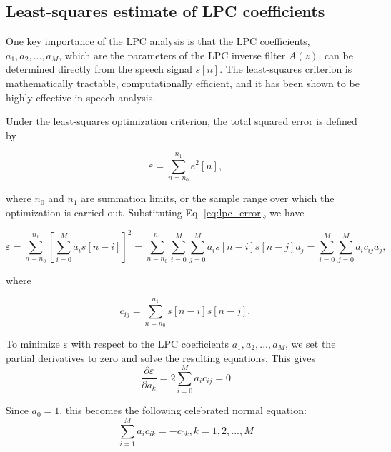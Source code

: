 \documentclass[12pt, a4paper, twoside]{report}
\begin{document}
\subsection{Least-squares estimate of LPC coefficients}
One key importance of the LPC analysis is that the LPC coefficients, $a_1, a_2, ..., a_M$, which are the parameters of the LPC inverse filter $A(z)$, can be determined directly from the speech signal $s[n]$. The least-squares criterion is mathematically tractable, computationally efficient, and it has been shown to be highly effective in speech analysis.

Under the least-squares optimization criterion, the total squared error is defined by

\begin{equation}
\varepsilon = \sum_{n=n_0}^{n_1} e^2[n],
\end{equation}

where $n_0$ and $n_1$ are summation limits, or the sample range over which the optimization is carried out. Substituting Eq. \ref{eq:lpc_error}, we have

\begin{equation}
\varepsilon = \sum_{n=n_0}^{n_1} \left [ \sum_{i=0}^{M} a_i s[n-i] \right ]^2 = \sum_{n=n_0}^{n_1} \sum_{i=0}^{M} \sum_{j=0}^{M} a_i s[n-i] s[n-j] a_j = \sum_{i=0}^{M} \sum_{j=0}^{M} a_i c_{ij} a_j,
\end{equation}

where

\begin{equation}
c_{ij} = \sum_{n=n_0}^{n_1} s[n-i] s[n-j],
\end{equation}

To minimize $\varepsilon$ with respect to the LPC coefficients $a_1, a_2, ..., a_M$, we set the partial derivatives to zero and solve the resulting equations. This gives
\begin{equation}
\frac{\partial \varepsilon }{\partial a_k} = 2 \sum_{i=0}^{M} a_i c_{ij} = 0
\end{equation}

Since $a_0 = 1$, this becomes the following celebrated normal equation:
\begin{equation}
\sum_{i=1}^{M} a_i c_{ik} = -c_{0k}, k = 1, 2,..., M
\end{equation}
\end{document}
